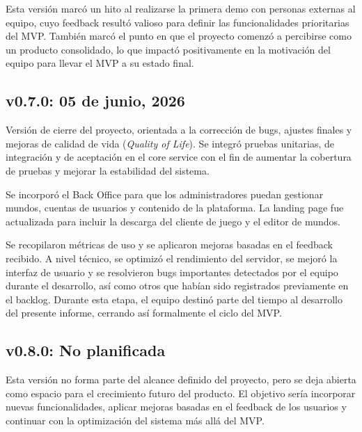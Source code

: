 \vspace{0.25cm}

Esta versión marcó un hito al realizarse la primera demo con personas externas al equipo, cuyo feedback 
resultó valioso para definir las funcionalidades prioritarias del MVP.
También marcó el punto en que el proyecto comenzó a percibirse como un producto consolidado, lo que impactó positivamente 
en la motivación del equipo para llevar el MVP a su estado final.

\subsection{v0.7.0: 05 de junio, 2026}

Versión de cierre del proyecto, orientada a la corrección de bugs, ajustes finales y mejoras de 
calidad de vida (\textit{Quality of Life}). Se integró pruebas unitarias, de integración y de aceptación
en el core service con el fin de aumentar la cobertura de pruebas y mejorar la estabilidad del sistema. 

Se incorporó el Back Office para que los administradores puedan gestionar mundos, 
cuentas de usuarios y contenido de la plataforma. La landing page fue actualizada para incluir 
la descarga del cliente de juego y el editor de mundos.

\vspace{0.25cm}

Se recopilaron métricas de uso y se aplicaron mejoras basadas en el feedback recibido. A nivel técnico, 
se optimizó el rendimiento del servidor, se mejoró la interfaz de usuario y se resolvieron bugs 
importantes detectados por el equipo durante el desarrollo, así como otros que habían sido registrados 
previamente en el backlog. Durante esta etapa, el equipo destinó parte del tiempo al desarrollo del 
presente informe, cerrando así formalmente el ciclo del MVP.

\subsection{v0.8.0: No planificada}

Esta versión no forma parte del alcance definido del proyecto, pero se deja abierta como espacio para 
el crecimiento futuro del producto. El objetivo sería incorporar nuevas funcionalidades, aplicar mejoras 
basadas en el feedback de los usuarios y continuar con la optimización del sistema más allá del MVP.
